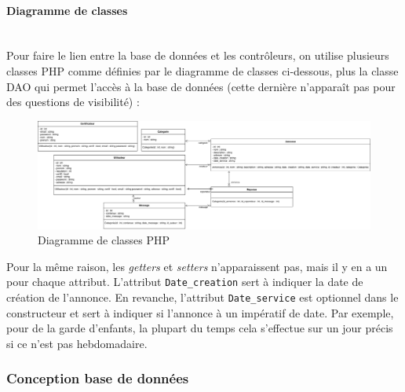 \documentclass[a4paper,11pt]{article}
\begin{document}
\paragraph{Diagramme de classes}\mbox{} \\

Pour faire le lien entre la base de données et les contrôleurs, on utilise plusieurs classes PHP comme définies par le diagramme de classes ci-dessous,
plus la classe DAO qui permet l'accès à la base de données (cette dernière n'apparaît pas pour des questions de visibilité) :\\

\begin{figure}[H]
  \includegraphics[width=\linewidth]{../Conception/PHP/DC.png}
  \caption{Diagramme de classes PHP}
  \label{fig:<un-label-court>}
\end{figure}

Pour la même raison, les \textit{getters} et \textit{setters} n'apparaissent pas, mais il y en a un pour chaque attribut.
L'attribut \texttt{Date\_creation} sert à indiquer la date de création de l'annonce.
En revanche, l'attribut \texttt{Date\_service} est optionnel dans le constructeur et sert à indiquer si l'annonce à un impératif de date.
Par exemple, pour de la garde d'enfants, la plupart du temps cela s'effectue sur un jour précis si ce n'est pas hebdomadaire.\\

\subsubsection{Conception base de données}
\end{document}
